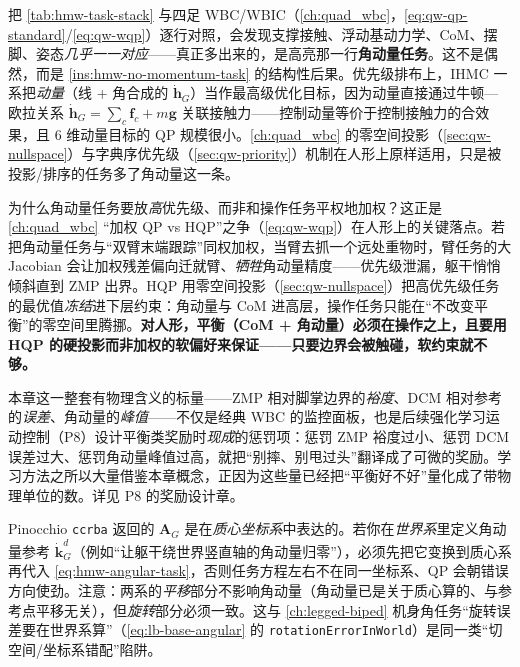\begin{insight}\label{ins:hmw-vs-quad}
把 \cref{tab:hmw-task-stack} 与四足 WBC/WBIC（\cref{ch:quad_wbc}，\cref{eq:qw-qp-standard}/\cref{eq:qw-wqp}）逐行对照，会发现支撑接触、浮动基动力学、CoM、摆脚、姿态\emph{几乎一一对应}——真正多出来的，是高亮那一行\textbf{角动量任务}。这不是偶然，而是 \cref{ins:hmw-no-momentum-task} 的结构性后果。优先级排布上，IHMC 一系把\emph{动量}（线 + 角合成的 $\dot{\mathbf h}_G$）当作最高级优化目标，因为动量直接通过牛顿—欧拉关系 $\dot{\mathbf h}_G=\sum_c\mathbf f_c+m\mathbf g$ 关联接触力——控制动量等价于控制接触力的合效果，且 $6$ 维动量目标的 QP 规模很小。\cref{ch:quad_wbc} 的零空间投影（\cref{sec:qw-nullspace}）与字典序优先级（\cref{sec:qw-priority}）机制在人形上原样适用，只是被投影/排序的任务多了角动量这一条。
\end{insight}

\begin{insight}\label{ins:hmw-hqp-momentum}
为什么角动量任务要放\emph{高}优先级、而非和操作任务平权地加权？这正是 \cref{ch:quad_wbc} “加权 QP vs HQP”之争（\cref{eq:qw-wqp}）在人形上的关键落点。若把角动量任务与“双臂末端跟踪”同权加权，当臂去抓一个远处重物时，臂任务的大 Jacobian 会让加权残差偏向迁就臂、\emph{牺牲}角动量精度——优先级泄漏，躯干悄悄倾斜直到 ZMP 出界。HQP 用零空间投影（\cref{sec:qw-nullspace}）把高优先级任务的最优值\emph{冻结}进下层约束：角动量与 CoM 进高层，操作任务只能在“不改变平衡”的零空间里腾挪。\textbf{对人形，平衡（CoM + 角动量）必须在操作之上，且要用 HQP 的硬投影而非加权的软偏好来保证——只要边界会被触碰，软约束就不够。}
\end{insight}

\begin{note}\label{note:hmw-reward-signals}
本章这一整套有物理含义的标量——ZMP 相对脚掌边界的\emph{裕度}、DCM 相对参考的\emph{误差}、角动量的\emph{峰值}——不仅是经典 WBC 的监控面板，也是后续强化学习运动控制（P8）设计平衡类奖励时\emph{现成}的惩罚项：惩罚 ZMP 裕度过小、惩罚 DCM 误差过大、惩罚角动量峰值过高，就把“别摔、别甩过头”翻译成了可微的奖励。学习方法之所以大量借鉴本章概念，正因为这些量已经把“平衡好不好”量化成了带物理单位的数。详见 P8 的奖励设计章。
\end{note}

\begin{pitfall}\label{pit:hmw-cmm-frame}
Pinocchio \texttt{ccrba} 返回的 $\mathbf A_G$ 是在\emph{质心坐标系}中表达的。若你在\emph{世界系}里定义角动量参考 $\dot{\mathbf k}_G^d$（例如“让躯干绕世界竖直轴的角动量归零”），必须先把它变换到质心系再代入 \cref{eq:hmw-angular-task}，否则任务方程左右不在同一坐标系、QP 会朝错误方向使劲。注意：两系的\emph{平移}部分不影响角动量（角动量已是关于质心算的、与参考点平移无关），但\emph{旋转}部分必须一致。这与 \cref{ch:legged-biped} 机身角任务“旋转误差要在世界系算”（\cref{eq:lb-base-angular} 的 \texttt{rotationErrorInWorld}）是同一类“切空间/坐标系错配”陷阱。
\end{pitfall}

